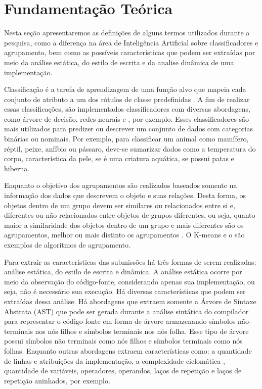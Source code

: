 	\section{Fundamentação Teórica}
	\label{sec:FundTeor}
		Nesta seção apresentaremos as definições de alguns termos utilizados
		durante a pesquisa, como a diferença na área de Inteligência Artificial
		sobre classificadores e agrupamento, bem como as possíveis características
		que podem ser extraídas por meio da análise estática, do estilo de escrita
		e da analise dinâmica de uma implementação.
		
		Classificação é a tarefa de aprendizagem de uma função alvo que mapeia cada
		conjunto de atributo a um dos rótulos de classe predefinidas \cite{Tan:2005:ch4}. A
		fim de realizar essas classificações, são implementados classificadores com
		diversas abordagens, como árvore de decisão, redes neurais e , por exemplo. Esses classificadores são mais utilizados para
		predizer ou descrever um conjunto de dados com categorias binárias ou nominais.
		Por exemplo, para classificar um animal como mamífero, réptil, peixe, anfíbio
		ou pássaro, deve-se sumarizar dados como a temperatura do corpo, característica
		da pele, se é uma criatura aquática, se possui patas e hiberna.
		
		Enquanto o objetivo dos agrupamentos são realizados baseados somente na informação
		dos dados que descrevem o objeto e suas relações. Desta forma, os objetos dentro
		de um grupo devem ser similares ou relacionados entre si e, diferentes ou não
		relacionados entre objetos de grupos diferentes, ou seja, quanto maior a similaridade
		dos objetos dentro de um grupo e mais diferentes são os agrupamentos, melhor ou mais
		distinto os agrupamentos \cite{Tan:2005:ch8}. O K-means \cite{macqueen1967} e o
		 \cite{Ester1996} são
		exemplos de algoritmos de agrupamento.
		
		Para extrair as características das submissões há três formas de serem realizadas:
		análise estática, do estilo de escrita e dinâmica. A análise estática ocorre por meio
		da observação do código-fonte, considerando apenas sua implementação, ou seja, não
		é necessário sua execução. Há diversas características que podem ser extraídas dessa
		análise. Há abordagens que extraem somente a Árvore de Sintaxe Abstrata (AST) que pode
		ser gerada durante a análise sintática do compilador para representar o código-fonte
		em forma de árvore armazenando símbolos não-terminais nos nós filhos e símbolos
		terminais nos nós folha. Esse tipo de árvore possui símbolos
		não terminais como nós filhos e símbolos terminais como nós folhas. Enquanto outras
		abordagens extraem características como: a quantidade de linhas e atribuições da
		implementação, a complexidade ciclomática \cite{mccabe}, quantidade de variáveis, 
		operadores, operandos, laços de repetição e laços de repetição aninhados, por exemplo.
		
